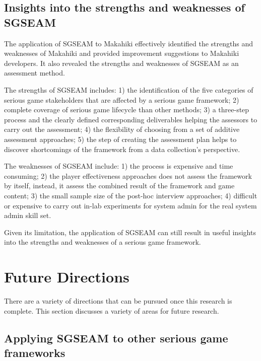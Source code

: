 \subsection{Insights into the strengths and weaknesses of SGSEAM}

The application of SGSEAM to Makahiki effectively identified the strengths and weaknesses of Makahiki and provided improvement suggestions to Makahiki developers. It also revealed the strengths and weaknesses of SGSEAM as an assessment method. 

The strengths of SGSEAM includes: 1) the identification of the five categories of serious game stakeholders that are affected by a serious game framework; 2) complete coverage of serious game lifecycle than other methods; 3) a three-step process and the clearly defined corresponding deliverables helping the assessors to carry out the assessment; 4) the flexibility of choosing from a set of additive assessment approaches; 5) the step of creating the assessment plan helps to discover shortcomings of the framework from a data collection's perspective.

The weaknesses of SGSEAM include: 1) the process is expensive and time consuming; 2) the player effectiveness approaches does not assess the framework by itself, instead, it assess the combined result of the framework and game content; 3) the small sample size of the post-hoc interview approaches; 4) difficult or expensive to carry out in-lab experiments for system admin for the real system admin skill set.

Given its limitation, the application of SGSEAM can still result in useful insights into the strengths and weaknesses of a serious game framework.

\section{Future Directions}

There are a variety of directions that can be pursued once this research is complete. This section discusses a variety of areas for future research.

\subsection{Applying SGSEAM to other serious game frameworks}
\label{future:other-framework}

